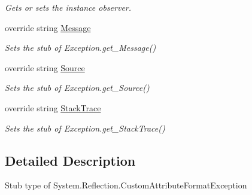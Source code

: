 \begin{DoxyCompactItemize}
\begin{DoxyCompactList}\small\item\em Gets or sets the instance observer.\end{DoxyCompactList}\item 
override string \hyperlink{class_system_1_1_reflection_1_1_fakes_1_1_stub_custom_attribute_format_exception_a438551d3e4b516203bcd2e5d74679207}{Message}
\begin{DoxyCompactList}\small\item\em Sets the stub of Exception.\-get\-\_\-\-Message()\end{DoxyCompactList}\item 
override string \hyperlink{class_system_1_1_reflection_1_1_fakes_1_1_stub_custom_attribute_format_exception_a943889f7bbbf383d140691ca827af3bc}{Source}
\begin{DoxyCompactList}\small\item\em Sets the stub of Exception.\-get\-\_\-\-Source()\end{DoxyCompactList}\item 
override string \hyperlink{class_system_1_1_reflection_1_1_fakes_1_1_stub_custom_attribute_format_exception_a408e5725c53f74883863cbff51f9bfdb}{Stack\-Trace}
\begin{DoxyCompactList}\small\item\em Sets the stub of Exception.\-get\-\_\-\-Stack\-Trace()\end{DoxyCompactList}\end{DoxyCompactItemize}


\subsection{Detailed Description}
Stub type of System.\-Reflection.\-Custom\-Attribute\-Format\-Exception



